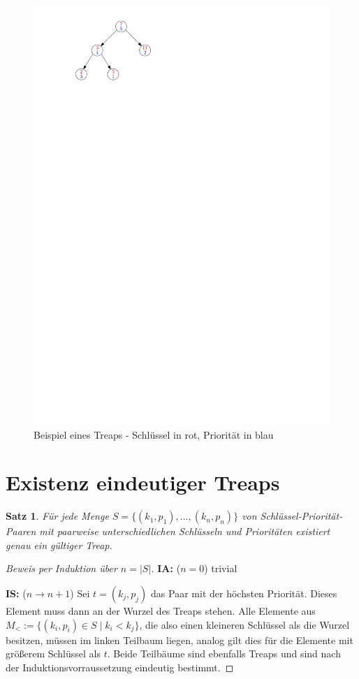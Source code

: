 \documentclass[a4paper]{scrreprt}
\newtheorem{satz}{Satz}[chapter]
\theoremstyle{definition}
\newenvironment{beweis}{\begin{proof}}{\end{proof}}
\begin{document}
\begin{figure}
\centering
\includegraphics{img/Beispiel_Treap.pdf}
\caption{Beispiel eines Treaps - Schlüssel in rot, Priorität in blau}
\label{fig:exampletreap}
\end{figure}


\section{Existenz eindeutiger Treaps}
\label{sec:uniquetreaps}

\begin{satz}
Für jede Menge $S = \{(k_1,p_1), \dots, (k_n, p_n)\}$ von Schlüssel-Priorität-Paaren mit paarweise unterschiedlichen Schlüsseln und Prioritäten existiert genau ein gültiger Treap.
\end{satz}
\begin{beweis}[Beweis per Induktion über $n = |S|$]
\noindent\textbf{IA:} ($n = 0$) trivial

\noindent\textbf{IS:} ($n \to n+1$)
Sei $t = (k_j, p_j)$ das Paar mit der höchsten Priorität.
Dieses Element muss dann an der Wurzel des Treaps stehen.
Alle Elemente aus $M_< := \{(k_i, p_i) \in S \mid k_i < k_j\}$, die also einen kleineren Schlüssel als die Wurzel besitzen, müssen im linken Teilbaum liegen, analog gilt dies für die Elemente mit größerem Schlüssel als $t$.
Beide Teilbäume sind ebenfalls Treaps und sind nach der Induktionsvorraussetzung eindeutig bestimmt.
\end{beweis} %
\end{document}
